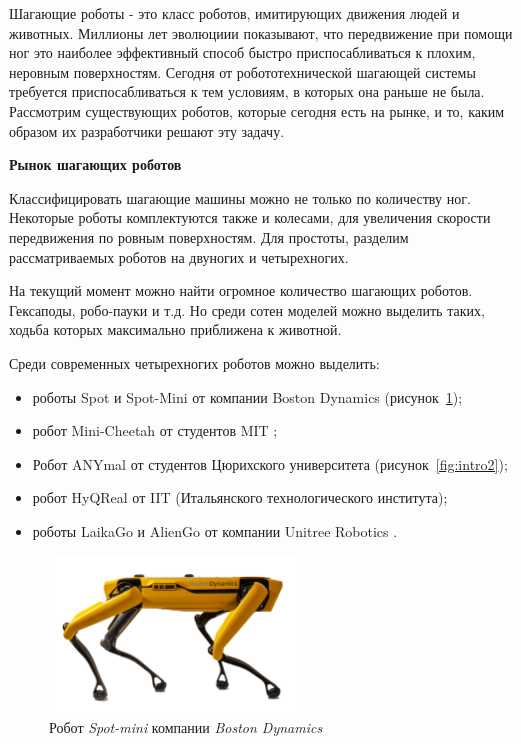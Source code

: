 
Шагающие роботы - это класс роботов, имитирующих движения людей и животных. Миллионы лет эволюциии показывают, что передвижение при помощи ног это наиболее эффективный способ быстро приспосабливаться к плохим, неровным поверхностям. Сегодня от робототехнической шагающей системы требуется приспосабливаться к тем условиям, в которых она раньше не была. Рассмотрим существующих роботов, которые сегодня есть на рынке, и то, каким образом их разработчики решают эту задачу.

\textbf{Рынок шагающих роботов}

Классифицировать шагающие машины можно не только по количеству ног. Некоторые роботы комплектуются также и колесами, для увеличения скорости передвижения по ровным поверхностям. Для простоты, разделим рассматриваемых роботов на двуногих и четырехногих. 

На текущий момент можно найти огромное количество шагающих роботов. Гексаподы, робо-пауки и т.д. Но среди сотен моделей можно выделить таких, ходьба которых максимально приближена к животной.

Среди современных четырехногих роботов можно выделить:
\begin{itemize}
    \item роботы Spot и Spot-Mini от компании Boston Dynamics \cite{BostonDynamics2020} (рисунок~\ref{fig:intro1});
    \item робот Mini-Cheetah от студентов MIT \cite{Mit2020};
    \item Робот ANYmal от студентов Цюрихского университета \cite{ZurichETH2020} (рисунок~\ref{fig:intro2});
    \item робот HyQReal от IIT \cite{Iit2020} (Итальянского технологического института);
    \item роботы LaikaGo и AlienGo от компании Unitree Robotics \cite{Unitree2020}.
\end{itemize}

\begin{figure}[h!]
    \centering
    \includegraphics[width=0.6\textwidth]{chapter_intro/figure1.png}
    \caption{Робот \textit{Spot-mini} компании \textit{Boston Dynamics}}
    \label{fig:intro1}
\end{figure}

